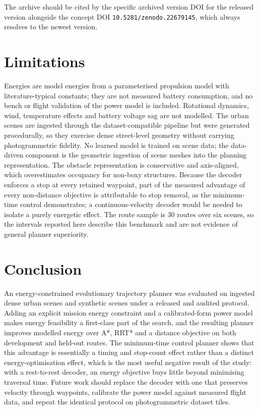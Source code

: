\documentclass[conference]{IEEEtran}
\begin{document}
The archive should be cited by the specific archived version DOI for the
released version alongside the concept DOI \texttt{10.5281/zenodo.22679145},
which always resolves to the newest version.

\section{Limitations}
Energies are model energies from a parameterised propulsion model with
literature-typical constants; they are not measured battery consumption, and no
bench or flight validation of the power model is included. Rotational dynamics,
wind, temperature effects and battery voltage sag are not modelled. The urban
scenes are ingested through the dataset-compatible pipeline but were generated
procedurally, so they exercise dense street-level geometry without carrying
photogrammetric fidelity. No learned model is trained on scene data; the
data-driven component is the geometric ingestion of scene meshes into the
planning representation. The obstacle representation is conservative and
axis-aligned, which overestimates occupancy for non-boxy structures. Because the
decoder enforces a stop at every retained waypoint, part of the measured
advantage of every non-distance objective is attributable to stop removal, as the
minimum-time control demonstrates; a continuous-velocity decoder would be needed
to isolate a purely energetic effect. The route sample is $30$ routes over six
scenes, so the intervals reported here describe this benchmark and are not
evidence of general planner superiority.

\section{Conclusion}
An energy-constrained evolutionary trajectory planner was evaluated on ingested
dense urban scenes and synthetic scenes under a released and audited protocol.
Adding an explicit mission energy constraint and a calibrated-form power model
makes energy feasibility a first-class part of the search, and the resulting
planner improves modelled energy over A*, RRT* and a distance objective on both
development and held-out routes. The minimum-time control planner shows that
this advantage is essentially a timing and stop-count effect rather than a
distinct energy-optimisation effect, which is the most useful negative result of
the study: with a rest-to-rest decoder, an energy objective buys little beyond
minimising traversal time. Future work should replace the decoder with one that
preserves velocity through waypoints, calibrate the power model against measured
flight data, and repeat the identical protocol on photogrammetric dataset tiles.
\end{document}
